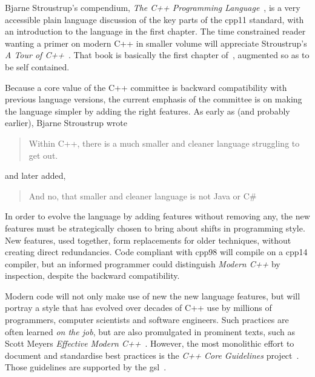 Bjarne Stroustrup's compendium, \emph{The C++ Programming
Language}~\cite{Stroustrup2013}, is a very accessible plain language discussion
of the key parts of the \ac{cpp11} standard, with an introduction to the
language in the first chapter. The time constrained reader wanting a primer on
modern C++ in smaller volume will appreciate Stroustrup's \emph{A Tour of
C++}~\cite{Stroustrup2013tour}. That book is basically the first chapter
of~\cite{Stroustrup2013}, augmented so as to be self contained.

Because a core value of the C++ committee is backward compatibility with
previous language versions, the current emphasis of the committee is on making
the language simpler by adding the right features. As early as  (and
probably earlier), Bjarne Stroustrup wrote
%
\begin{quote} Within C++, there is a much smaller and cleaner language
struggling to get out.\\\null\hfill{} \end{quote}
%
and later added,
%
\begin{quote} And no, that smaller and cleaner language is not Java or C\#\\
\null\hfill{}\end{quote}

In order to evolve the language by adding features without removing any, the new
features must be strategically chosen to bring about shifts in programming
style. New features, used together, form replacements for older techniques,
without creating direct redundancies. Code compliant with \ac{cpp98} will
compile on a \ac{cpp14} compiler, but an informed programmer could distinguish
\emph{Modern C++} by inspection, despite the backward compatibility.

Modern code will not only make use of new the new language features, but will
portray a style that has evolved over decades of C++ use by millions of
programmers, computer scientists and software engineers. Such practices are
often learned \emph{on the job}, but are also promulgated in prominent texts,
such as Scott Meyers \emph{Effective Modern C++}~\cite{meyers2014effective}.
However, the most monolithic effort to document and standardise best practices
is the \emph{C++ Core Guidelines} project~\cite{CppCoreGuidelines}. Those
guidelines are supported by the \acl{gsl}~\cite{cppgsl}.


